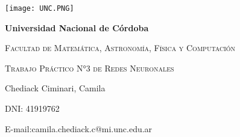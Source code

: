 \documentclass[12pt,a4paper]{article}
\begin{document}
\begin{titlepage}

\centering
\texttt{[image: UNC.PNG]}

\vspace{1cm}
{\bfseries\LARGE Universidad Nacional de Córdoba \par}
\vspace{1cm}
{\scshape\Large Facultad de Matemática, Astronomía, Física y Computación\par}
\vspace{1cm}
{\scshape\Huge Trabajo Práctico N°3 de Redes Neuronales}
\vspace{1cm}

{\Large Chediack Ciminari, Camila }
\vspace*{0.3cm}


DNI: 41919762 \\


\vspace*{0.3cm}

E-mail:camila.chediack.c@mi.unc.edu.ar

\end{titlepage}
\end{document}
